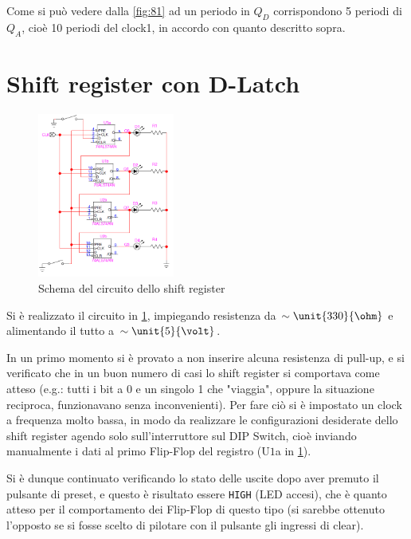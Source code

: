 \documentclass[a4paper,10pt]{article}
\def\code#1{\texttt{#1}}
\begin{document}
Come si può vedere dalla \cref{fig:81} ad un periodo in $Q_D$ corrispondono 5 periodi di $Q_A$, cioè 10 periodi del clock1, in accordo con quanto descritto sopra.

\pagebreak

\section{Shift register con D-Latch}

\begin{figure}
	\vspace{-20pt}
	\centering
	\includegraphics[width=0.4\textwidth]{../grafici/shiftreg.png}
	\vspace{-10pt}
	\caption{Schema del circuito dello shift register}
	\label{fig:shift}
	\vspace{-40pt}
\end{figure}

Si è realizzato il circuito in \cref{fig:shift}, impiegando resistenza da $\sim \unit{330}{\ohm}$ e alimentando il tutto a $\sim \unit{5}{\volt}$.

In un primo momento si è provato a non inserire alcuna resistenza di pull-up, e si verificato che in un buon numero di casi lo shift register si comportava come atteso (e.g.: tutti i bit a 0 e un singolo 1 che "viaggia", oppure la situazione reciproca, funzionavano senza inconvenienti). 
Per fare ciò si è impostato un clock a frequenza molto bassa, in modo da realizzare le configurazioni desiderate dello shift register agendo solo sull'interruttore sul DIP Switch, cioè inviando manualmente i dati al primo Flip-Flop del registro (U$1$a in \cref{fig:shift}).

Si è dunque continuato verificando lo stato delle uscite dopo aver premuto il pulsante di preset, e questo è risultato essere \code{HIGH} (LED accesi), che è quanto atteso per il comportamento dei Flip-Flop di questo tipo (si sarebbe ottenuto l'opposto se si fosse scelto di pilotare con il pulsante gli ingressi di clear).
\end{document}
